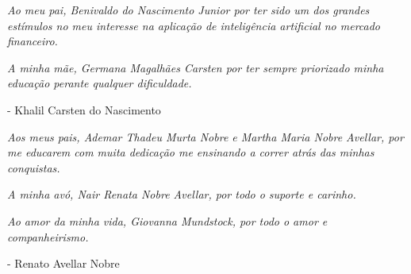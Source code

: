 
\textit{Ao meu pai, Benivaldo do Nascimento Junior por ter sido um dos grandes estímulos no meu interesse na aplicação de inteligência artificial no mercado financeiro.}

\noindent \textit{A minha mãe, Germana Magalhães Carsten por ter sempre priorizado minha educação perante qualquer dificuldade.}
\begin{flushright}
- Khalil Carsten do Nascimento
\end{flushright}

\vspace{1.0cm}

\noindent \textit{Aos meus pais, Ademar Thadeu Murta Nobre e Martha Maria Nobre Avellar, por me educarem com muita dedicação me ensinando a correr atrás das minhas conquistas.}

\noindent \textit{A minha avó, Nair Renata Nobre Avellar, por todo o suporte e carinho.}

\noindent \textit{Ao amor da minha vida, Giovanna Mundstock, por todo o amor e companheirismo.}

\begin{flushright}
- Renato Avellar Nobre
\end{flushright}